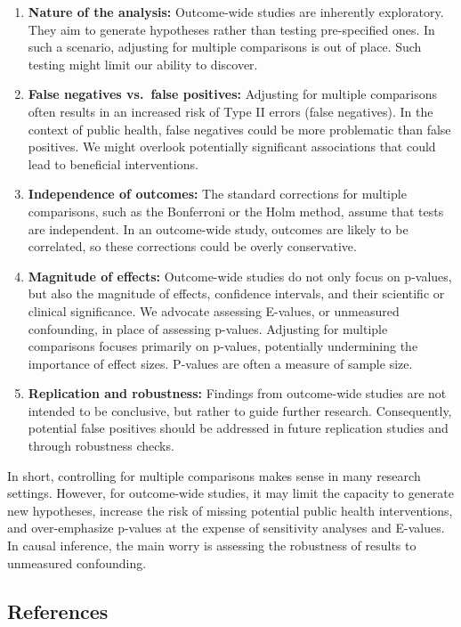 \documentclass[
  letterpaper,
  DIV=11,
  numbers=noendperiod]{scrartcl}
\begin{document}
\begin{enumerate}
\def\labelenumi{\arabic{enumi}.}
\item
  \textbf{Nature of the analysis:} Outcome-wide studies are inherently
  exploratory. They aim to generate hypotheses rather than testing
  pre-specified ones. In such a scenario, adjusting for multiple
  comparisons is out of place. Such testing might limit our ability to
  discover.
\item
  \textbf{False negatives vs.~false positives:} Adjusting for multiple
  comparisons often results in an increased risk of Type II errors
  (false negatives). In the context of public health, false negatives
  could be more problematic than false positives. We might overlook
  potentially significant associations that could lead to beneficial
  interventions.
\item
  \textbf{Independence of outcomes:} The standard corrections for
  multiple comparisons, such as the Bonferroni or the Holm method,
  assume that tests are independent. In an outcome-wide study, outcomes
  are likely to be correlated, so these corrections could be overly
  conservative.
\item
  \textbf{Magnitude of effects:} Outcome-wide studies do not only focus
  on p-values, but also the magnitude of effects, confidence intervals,
  and their scientific or clinical significance. We advocate assessing
  E-values, or unmeasured confounding, in place of assessing p-values.
  Adjusting for multiple comparisons focuses primarily on p-values,
  potentially undermining the importance of effect sizes. P-values are
  often a measure of sample size.
\item
  \textbf{Replication and robustness:} Findings from outcome-wide
  studies are not intended to be conclusive, but rather to guide further
  research. Consequently, potential false positives should be addressed
  in future replication studies and through robustness checks.
\end{enumerate}

In short, controlling for multiple comparisons makes sense in many
research settings. However, for outcome-wide studies, it may limit the
capacity to generate new hypotheses, increase the risk of missing
potential public health interventions, and over-emphasize p-values at
the expense of sensitivity analyses and E-values. In causal inference,
the main worry is assessing the robustness of results to unmeasured
confounding.

\hypertarget{references}{%
\subsection*{References}\label{references}}
\end{document}
